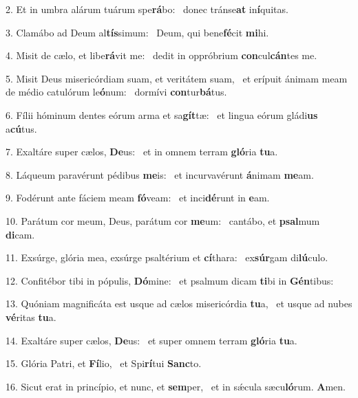 2. Et in umbra alárum tuárum spe\textbf{rá}bo: \ast\  donec tránse\textbf{at} in\textbf{í}quitas.\

3. Clamábo ad Deum al\textbf{tís}simum: \ast\  Deum, qui bene\textbf{fé}cit \textbf{mi}hi.\

4. Misit de cælo, et libe\textbf{rá}vit me: \ast\  dedit in oppróbrium \textbf{con}cul\textbf{cán}tes me.\

5. Misit Deus misericórdiam suam, et veritátem suam, \dag\  et erípuit ánimam meam de médio catulórum le\textbf{ó}num: \ast\  dormívi \textbf{con}tur\textbf{bá}tus.\

6. Fílii hóminum dentes eórum arma et sa\textbf{gít}tæ: \ast\  et lingua eórum gládi\textbf{us} a\textbf{cú}tus.\

7. Exaltáre super cælos, \textbf{De}us: \ast\  et in omnem terram \textbf{gló}ria \textbf{tu}a.\

8. Láqueum paravérunt pédibus \textbf{me}is: \ast\  et incurvavérunt \textbf{á}nimam \textbf{me}am.\

9. Fodérunt ante fáciem meam \textbf{fó}veam: \ast\  et inci\textbf{dé}runt in \textbf{e}am.\

10. Parátum cor meum, Deus, parátum cor \textbf{me}um: \ast\  cantábo, et \textbf{psal}mum \textbf{di}cam.\

11. Exsúrge, glória mea, exsúrge psaltérium et \textbf{cí}thara: \ast\  ex\textbf{súr}gam di\textbf{lú}culo.\

12. Confitébor tibi in pópulis, \textbf{Dó}mine: \ast\  et psalmum dicam \textbf{ti}bi in \textbf{Gén}tibus:\

13. Quóniam magnificáta est usque ad cælos misericórdia \textbf{tu}a, \ast\  et usque ad nubes \textbf{vé}ritas \textbf{tu}a.\

14. Exaltáre super cælos, \textbf{De}us: \ast\  et super omnem terram \textbf{gló}ria \textbf{tu}a.\

15. Glória Patri, et \textbf{Fí}lio, \ast\  et Spi\textbf{rí}tui \textbf{Sanc}to.\

16. Sicut erat in princípio, et nunc, et \textbf{sem}per, \ast\  et in sǽcula sæcu\textbf{ló}rum. \textbf{A}men.\

